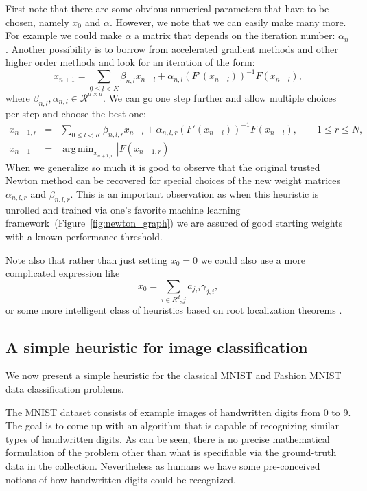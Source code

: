\documentclass{article}
\DeclareMathOperator*{\argmin}{arg\,min}
\begin{document}
First note that there are some obvious numerical parameters that have to be chosen, namely $x_0$ and $\alpha$. However, we note that we can easily make many more. For example we could make $\alpha$ a matrix that depends on the iteration number: $\alpha_n$. Another possibility is to borrow from accelerated gradient methods and other higher order methods and look for an iteration of the form:
\[
    x_{n+1} = \sum_{0 \leq l < K} \beta_{n,l} x_{n-l} + \alpha_{n,l} (F'(x_{n-l}))^{-1}F(x_{n-l}),
\]
where $\beta_{n,l},\alpha_{n,l} \in \mathcal{R}^{d\times d}$. We can go one step further and allow multiple choices per step and choose the best one:
\begin{eqnarray*}
x_{n+1,r} & = & \sum_{0 \leq l < K} \beta_{n,l,r} x_{n-l} + \alpha_{n,l,r} (F'(x_{n-l}))^{-1}F(x_{n-l}), \qquad 1 \leq r \leq N, \\
x_{n+1} &=& \argmin_{x_{n+1,r}} |F(x_{n+1,r})|
\end{eqnarray*}
When we generalize so much it is good to observe that the original trusted Newton method can be recovered for special choices of the new weight matrices $\alpha_{n,l,r}$ and $\beta_{n,l,r}$. This is an important observation as when this heuristic is unrolled and trained via one's favorite machine learning framework~(Figure~\ref{fig:newton_graph}) we are assured of good starting weights with a known performance threshold.

Note also that rather than just setting $x_0=0$ we could also use a more complicated expression like
\[
    x_0 = \sum_{i\in R^d,j} a_{j,i} \gamma_{j,i},
\]
or some more intelligent class of heuristics based on root localization theorems \cite{bini1996numerical}.

\subsection*{A simple heuristic for image classification}

We now present a simple heuristic for the classical MNIST and Fashion MNIST data classification problems.

The MNIST dataset consists of example images of handwritten digits from 0 to 9. The goal is to come up with an algorithm that is capable of recognizing similar types of handwritten digits. As can be seen, there is no precise mathematical formulation of the problem other than what is specifiable via the ground-truth data in the collection. Nevertheless as humans we have some pre-conceived notions of how handwritten digits could be recognized.
\end{document}
